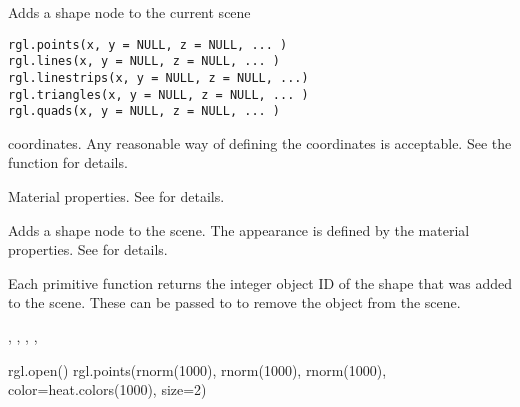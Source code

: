 \begin{Description}\relax
Adds a shape node to the current scene
\end{Description}
\begin{Usage}
\begin{verbatim}
rgl.points(x, y = NULL, z = NULL, ... )
rgl.lines(x, y = NULL, z = NULL, ... )
rgl.linestrips(x, y = NULL, z = NULL, ...)
rgl.triangles(x, y = NULL, z = NULL, ... )
rgl.quads(x, y = NULL, z = NULL, ... )
\end{verbatim}
\end{Usage}
\begin{Arguments}
\begin{ldescription}
\item[\code{x, y, z}] coordinates.  Any reasonable way of defining the
coordinates is acceptable.  See the function 
for details.
\item[\code{ ... }] Material properties. See  for details.
\end{ldescription}
\end{Arguments}
\begin{Details}\relax
Adds a shape node to the scene. The appearance is defined by the material properties.
See  for details.
\end{Details}
\begin{Value}
Each primitive function returns the integer object ID of the shape that
was added to the scene.  These can be passed to 
to remove the object from the scene.
\end{Value}
\begin{SeeAlso}\relax
{},
,
,
,
\end{SeeAlso}
\begin{Examples}
\begin{ExampleCode}
rgl.open()
rgl.points(rnorm(1000), rnorm(1000), rnorm(1000), color=heat.colors(1000), size=2)
\end{ExampleCode}
\end{Examples}

